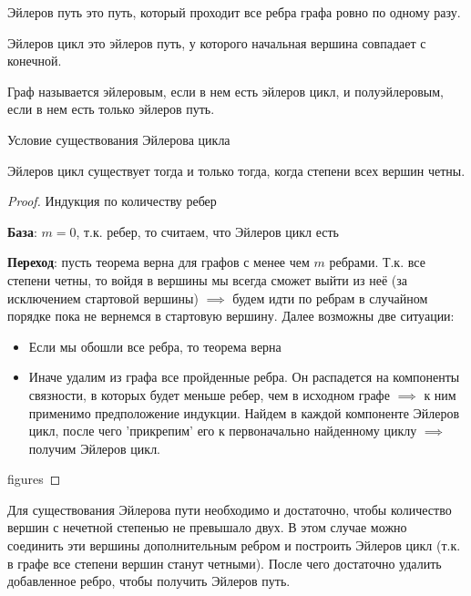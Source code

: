 
\begin{definition}
  Эйлеров путь это путь, который проходит все ребра графа ровно по одному разу.
\end{definition}

\begin{definition}
  Эйлеров цикл это эйлеров путь, у которого начальная вершина совпадает с
  конечной.
\end{definition}

\begin{definition}
  Граф называется эйлеровым, если в нем есть эйлеров цикл, и полуэйлеровым, если
  в нем есть только эйлеров путь.
\end{definition}

\begin{theorem}
  Условие существования Эйлерова цикла

  Эйлеров цикл существует тогда и только тогда, когда степени всех вершин четны.  
\end{theorem}
\begin{proof}
  Индукция по количеству ребер

  \textbf{База}: \(m = 0\), т.к. ребер, то считаем, что Эйлеров цикл есть

  \textbf{Переход}: пусть теорема верна для графов с менее чем \(m\) ребрами.
  Т.к. все степени четны, то войдя в вершины мы всегда сможет выйти из неё (за
  исключением стартовой вершины) \(\implies\) будем идти по ребрам в случайном
  порядке пока не вернемся в стартовую вершину. Далее возможны две ситуации:

  \begin{itemize}
    \item Если мы обошли все ребра, то теорема верна
    \item Иначе удалим из графа все пройденные ребра. Он распадется на
    компоненты связности, в которых будет меньше ребер, чем в исходном графе
    \(\implies\) к ним применимо предположение индукции. Найдем в каждой
    компоненте Эйлеров цикл, после чего 'прикрепим' его к первоначально
    найденному циклу \(\implies\) получим Эйлеров цикл.
  \end{itemize}

  \todo figures
\end{proof}

\begin{remark}
  Для существования Эйлерова пути необходимо и достаточно, чтобы количество
  вершин с нечетной степенью не превышало двух. В этом случае можно соединить
  эти вершины дополнительным ребром и построить Эйлеров цикл (т.к. в графе все
  степени вершин станут четными). После чего достаточно удалить добавленное
  ребро, чтобы получить Эйлеров путь.
\end{remark}
